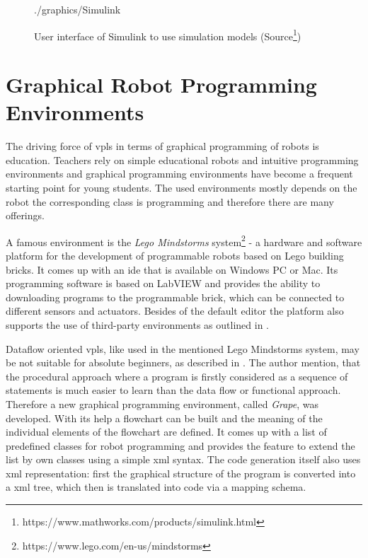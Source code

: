 \begin{figure}[!hb]
	\centering
	\begin{overpic}[width=0.65\linewidth]{./graphics/Simulink}
	\end{overpic}
    \caption[User interface of Simulink to use simulation models]%
    {User interface of Simulink to use simulation models (Source\footnote{https://www.mathworks.com/products/simulink.html})}
	\label{fig:Simulink}%
\end{figure}

\section{Graphical Robot Programming Environments}
The driving force of \glspl{vpl} in terms of graphical programming of robots is education. Teachers rely on simple educational robots and intuitive programming environments and graphical programming environments have become a frequent starting point for young students. The used environments mostly depends on the robot the corresponding class is programming and therefore there are many offerings.

A famous environment is the \textit{Lego Mindstorms} system\footnote{https://www.lego.com/en-us/mindstorms} - a hardware and software platform for the development of programmable robots based on Lego building bricks. It comes up with an \gls{ide} that is available on Windows PC or Mac. Its programming software is based on LabVIEW and provides the ability to downloading programs to the programmable brick, which can be connected to different sensors and actuators. Besides of the default editor the platform also supports the use of third-party environments as outlined in \cite{Hirst2003}.

Dataflow oriented \glspl{vpl}, like used in the mentioned Lego Mindstorms system, may be not suitable for absolute beginners, as described in \cite{Grape}. The author mention, that the procedural approach where a program is firstly considered as a sequence of statements is much easier to learn than the data flow or functional approach. Therefore a new graphical programming environment, called \textit{Grape}, was developed. With its help a flowchart can be built and the meaning of the individual elements of the flowchart are defined. It comes up with a list of predefined classes for robot programming and provides the feature to extend the list by own classes using a simple \gls{xml} syntax. The code generation itself also uses \gls{xml} representation: first the graphical structure of the program is converted into a \gls{xml} tree, which then is translated into \Cpp{} code via a mapping schema.

